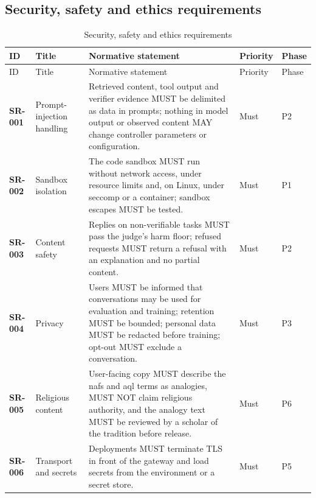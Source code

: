 \subsection{Security, safety and ethics requirements}
\begin{longtable}{@{}p{1.45cm}p{2.5cm}p{8.1cm}p{1.6cm}p{1.1cm}@{}}
\caption{Security, safety and ethics requirements}\\
\toprule ID & Title & Normative statement & Priority & Phase\\\midrule\endfirsthead
\toprule ID & Title & Normative statement & Priority & Phase\\\midrule\endhead
\bottomrule\endfoot
\textbf{SR-001} & Prompt-injection handling & Retrieved content, tool output and verifier evidence MUST be delimited as data in prompts; nothing in model output or observed content MAY change controller parameters or configuration. & Must & P2\\
\textbf{SR-002} & Sandbox isolation & The code sandbox MUST run without network access, under resource limits and, on Linux, under seccomp or a container; sandbox escapes MUST be tested. & Must & P1\\
\textbf{SR-003} & Content safety & Replies on non-verifiable tasks MUST pass the judge's harm floor; refused requests MUST return a refusal with an explanation and no partial content. & Must & P2\\
\textbf{SR-004} & Privacy & Users MUST be informed that conversations may be used for evaluation and training; retention MUST be bounded; personal data MUST be redacted before training; opt-out MUST exclude a conversation. & Must & P3\\
\textbf{SR-005} & Religious content & User-facing copy MUST describe the nafs and aql terms as analogies, MUST NOT claim religious authority, and the analogy text MUST be reviewed by a scholar of the tradition before release. & Must & P6\\
\textbf{SR-006} & Transport and secrets & Deployments MUST terminate TLS in front of the gateway and load secrets from the environment or a secret store. & Must & P5\\
\end{longtable}

